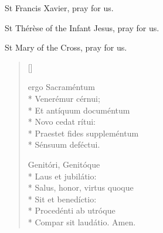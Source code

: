 St Francis Xavier, \Rbar pray for us.

St Thérèse of the Infant Jesus, \Rbar pray for us. 

St Mary of the Cross, \Rbar pray for us. 



%





\newHymn


\begin{verse}[\versewidth]
\begin{altverse}

 ergo Sacraméntum\\*
Venerémur cérnui;\\*
Et antíquum documéntum\\*
Novo cedat rítui:\\*
Praestet fides suppleméntum\\*
Sénsuum deféctui.
\end{altverse}

\begin{altverse}
Genitóri, Genitóque\\*
Laus et jubilátio:\\*
Salus, honor, virtus quoque\\*
Sit et benedíctio:\\*
Procedénti ab utróque\\*
Compar sit laudátio.  Amen.

\end{altverse}
\end{verse}


\newHymn



